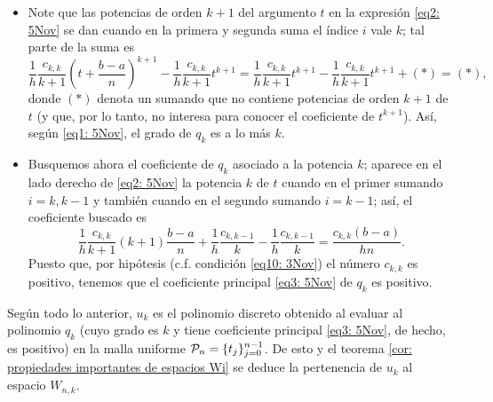 \begin{itemize}
\item Note que las potencias de orden $k+1$ del argumento
$t$ en la expresión \eqref{eq2: 5Nov}
se dan
cuando en la primera y segunda suma el índice $i$
vale $k$; 
tal parte de la suma es 
\begin{equation}
\label{eq1: 5Nov}
\frac{1}{h} \frac{c_{k,k}}{k+1} \left(t+\frac{b-a}{n} \right)^{k+1}-
\frac{1}{h} \frac{c_{k,k}}{k+1} t^{k+1}=
\frac{1}{h} \frac{c_{k,k}}{k+1} t^{k+1}-\frac{1}{h} \frac{c_{k,k}}{k+1} t^{k+1}+ (*)=(*),
\end{equation} 
donde $(*)$ denota un sumando que no contiene potencias de orden
$k+1$ de $t$ (y que, por lo tanto, no interesa para conocer
el coeficiente de $t^{k+1}$).
Así, según \eqref{eq1: 5Nov}, el grado
de $q_{k}$ es a lo más $k$.
\item Busquemos ahora el coeficiente de $q_{k}$ asociado a la
potencia $k$; aparece en
el lado derecho de \eqref{eq2: 5Nov} la potencia $k$
de $t$ cuando en el primer sumando $i=k, k-1$
y también cuando en el segundo sumando $i=k-1$;
así, el coeficiente buscado es
\begin{equation}
\label{eq3: 5Nov}
\frac{1}{h} \frac{c_{k,k}}{k+1}(k+1)\frac{b-a}{n} 
+\frac{1}{h} \frac{c_{k,k-1}}{k}-
\frac{1}{h} \frac{c_{k,k-1}}{k} = 
\frac{c_{k,k}(b-a)}{hn}.
\end{equation}
Puesto que, por hipótesis (c.f. 
condición \eqref{eq10: 3Nov})
el número $c_{k,k}$ es positivo, tenemos que 
el coeficiente principal \ref{eq3: 5Nov}
de $q_{k}$ es positivo.
\end{itemize}


Según todo lo anterior, $u_{k}$
es el polinomio discreto obtenido al evaluar
al polinomio $q_{k}$ (cuyo grado es $k$ y tiene
coeficiente principal \eqref{eq3: 5Nov},
de hecho, es positivo)
en la malla uniforme 
$\mathcal{P}_{n}=\{t_{j}\}_{j=0}^{n-1}$.
De esto y el teorema 
\ref{cor: propiedades importantes de espacios Wi}
se deduce la pertenencia de $u_{k}$ al espacio $W_{n,k}$.
\QEDB
\vspace{0.2cm}

